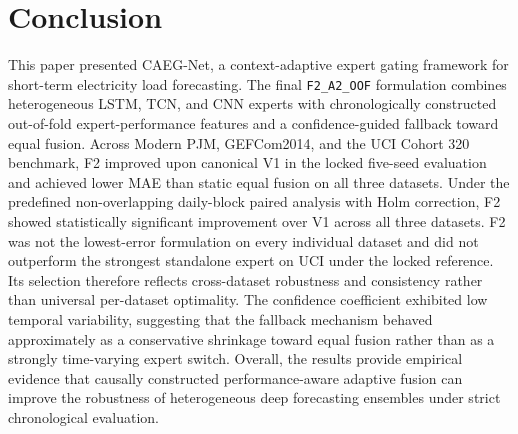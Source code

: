\documentclass[journal,10pt,twocolumn]{IEEEtran}
\begin{document}
\section{Conclusion}
This paper presented CAEG-Net, a context-adaptive expert gating framework for short-term electricity load forecasting. The final \texttt{F2\_A2\_OOF} formulation combines heterogeneous LSTM, TCN, and CNN experts with chronologically constructed out-of-fold expert-performance features and a confidence-guided fallback toward equal fusion. Across Modern PJM, GEFCom2014, and the UCI Cohort 320 benchmark, F2 improved upon canonical V1 in the locked five-seed evaluation and achieved lower MAE than static equal fusion on all three datasets. Under the predefined non-overlapping daily-block paired analysis with Holm correction, F2 showed statistically significant improvement over V1 across all three datasets. F2 was not the lowest-error formulation on every individual dataset and did not outperform the strongest standalone expert on UCI under the locked reference. Its selection therefore reflects cross-dataset robustness and consistency rather than universal per-dataset optimality. The confidence coefficient exhibited low temporal variability, suggesting that the fallback mechanism behaved approximately as a conservative shrinkage toward equal fusion rather than as a strongly time-varying expert switch. Overall, the results provide empirical evidence that causally constructed performance-aware adaptive fusion can improve the robustness of heterogeneous deep forecasting ensembles under strict chronological evaluation.



\end{document}
